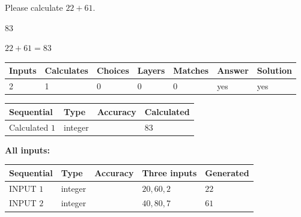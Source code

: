 \documentclass[12pt]{article}
\begin{document}
  
 
Please calculate $ %
22 +  %
61 $.
 
 
 
\noindent{}
 
 

83
 
 
\noindent{}
 
 

 
 
 
\noindent{}
 
 

$ %
22 +  %
61=   %
83$
 
 
\noindent{}
 
 

 
   
   
   
   
\noindent\begin{tabular}{|l|l|l|l|l|l|l|}
 \hline
Inputs & Calculates & Choices & Layers & Matches & Answer & Solution \\ \hline
 2  & 
 1  & 
 0
  & 
 0  & 
 0  & 
  yes & 
  yes 
  \\ \hline
 \end{tabular}
   
   
   
   
\noindent{}
   
   
  
  
\noindent\begin{tabular}{|l|l|l|l|}
\hline
 Sequential & Type & Accuracy & Calculated \\ 
\hline
 
 
  Calculated $  1 $ & integer &  & 
  $ 83 $ 
 \\  \hline  
 \end{tabular}
   
   
   
   
\noindent\vspace{0.1in}\hspace{-0.08in} {\textbf{\Large{All inputs: }}}
   
   
  
  
\noindent\begin{tabular}{|l|l|l|l|l|}
\hline
 Sequential & Type & Accuracy & Three inputs & Generated \\ 
\hline
 
 
  INPUT $  1 $ & integer &  & $
 20
 , 
 60
 , 
 2
 $ & $ 22 $ 
 \\  \hline  
 
 
  INPUT $  2 $ & integer &  & $
 40
 , 
 80
 , 
 7
 $ & $ 61 $ 
 \\  \hline  
 \end{tabular}
   
\end{document}
